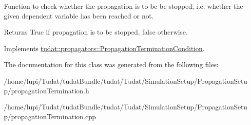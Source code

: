 Function to check whether the propagation is to be be stopped, i.\+e. whether the given dependent variable has been reached or not. \begin{DoxyReturn}{Returns}
True if propagation is to be stopped, false otherwise. 
\end{DoxyReturn}


Implements \hyperlink{classtudat_1_1propagators_1_1PropagationTerminationCondition_a2a53592475bbfb408fd12faf21c5f3be}{tudat\+::propagators\+::\+Propagation\+Termination\+Condition}.



The documentation for this class was generated from the following files\+:\begin{DoxyCompactItemize}
\item 
/home/lupi/\+Tudat/tudat\+Bundle/tudat/\+Tudat/\+Simulation\+Setup/\+Propagation\+Setup/propagation\+Termination.\+h\item 
/home/lupi/\+Tudat/tudat\+Bundle/tudat/\+Tudat/\+Simulation\+Setup/\+Propagation\+Setup/propagation\+Termination.\+cpp\end{DoxyCompactItemize}

